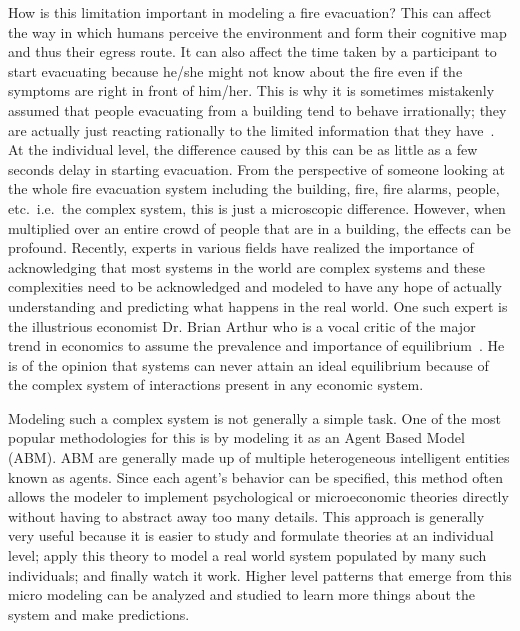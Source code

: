 How is this limitation important in modeling a fire evacuation? This can affect the way in which humans perceive the environment and form their cognitive map and thus their egress route. It can also affect the time taken by a participant to start evacuating because he/she might not know about the fire even if the symptoms are right in front of him/her. This is why it is sometimes mistakenly assumed that people evacuating from a building tend to behave irrationally; they are actually just reacting rationally to the limited information that they have~\cite{Kobes:2009jx,Schadschneider:2008cz,Reicher:2008ep,Torres:2010tj,Paulsen:1984ti,Sime:1983uy}. At the individual level, the difference caused by this can be as little as a few seconds delay in starting evacuation. From the perspective of someone looking at the whole fire evacuation system including the building, fire, fire alarms, people, etc.\ i.e.\ the complex system, this is just a microscopic difference. However, when multiplied over an entire crowd of people that are in a building, the effects can be profound. Recently, experts in various fields have realized the importance of acknowledging that most systems in the world are complex systems and these complexities need to be acknowledged and modeled to have any hope of actually understanding and predicting what happens in the real world. One such expert is the illustrious economist Dr. Brian Arthur who is a vocal critic of the major trend in economics to assume the prevalence and importance of equilibrium~\cite{Arthur:2010uy}. He is of the opinion that systems can never attain an ideal equilibrium because of the complex system of interactions present in any economic system.

Modeling such a complex system is not generally a simple task. One of the most popular methodologies for this is by modeling it as an Agent Based Model (ABM). ABM are generally made up of multiple heterogeneous intelligent entities known as agents. Since each agent's behavior can be specified, this method often allows the modeler to implement psychological or microeconomic theories directly without having to abstract away too many details. This approach is generally very useful because it is easier to study and formulate theories at an individual level; apply this theory to model a real world system populated by many such individuals; and finally watch it work. Higher level patterns that emerge from this micro modeling can be analyzed and studied to learn more things about the system and make predictions.

